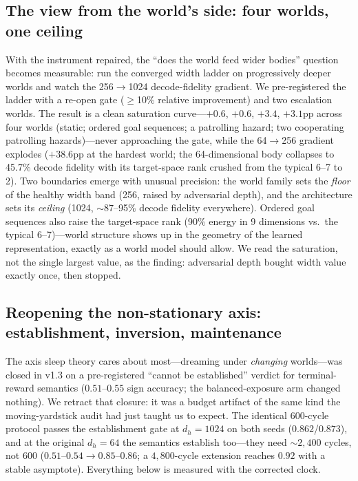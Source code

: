\documentclass[11pt,a4paper]{article}
\begin{document}
\subsection{The view from the world's side: four worlds, one ceiling}\label{sec:kfamily}

With the instrument repaired, the ``does the world feed wider bodies'' question becomes measurable: run the converged width ladder on progressively deeper worlds and watch the 256$\to$1024 decode-fidelity gradient. We pre-registered the ladder with a re-open gate ($\ge$10\% relative improvement) and two escalation worlds. The result is a clean saturation curve---$+0.6$, $+0.6$, $+3.4$, $+3.1$pp across four worlds (static; ordered goal sequences; a patrolling hazard; two cooperating patrolling hazards)---never approaching the gate, while the 64$\to$256 gradient explodes ($+38.6$pp at the hardest world; the 64-dimensional body collapses to 45.7\% decode fidelity with its target-space rank crushed from the typical 6--7 to 2). Two boundaries emerge with unusual precision: the world family sets the \emph{floor} of the healthy width band (256, raised by adversarial depth), and the architecture sets its \emph{ceiling} (1024, ${\sim}87$--95\% decode fidelity everywhere). Ordered goal sequences also raise the target-space rank (90\% energy in 9 dimensions vs.\ the typical 6--7)---world structure shows up in the geometry of the learned representation, exactly as a world model should allow. We read the saturation, not the single largest value, as the finding: adversarial depth bought width value exactly once, then stopped.

\subsection{Reopening the non-stationary axis: establishment, inversion, maintenance}\label{sec:nonstat}

The axis sleep theory cares about most---dreaming under \emph{changing} worlds---was closed in v1.3 on a pre-registered ``cannot be established'' verdict for terminal-reward semantics ($0.51$--$0.55$ sign accuracy; the balanced-exposure arm changed nothing). We retract that closure: it was a budget artifact of the same kind the moving-yardstick audit had just taught us to expect. The identical 600-cycle protocol passes the establishment gate at $d_h{=}1024$ on both seeds ($0.862$/$0.873$), and at the original $d_h{=}64$ the semantics establish too---they need ${\sim}2{,}400$ cycles, not 600 ($0.51$--$0.54 \rightarrow 0.85$--$0.86$; a $4{,}800$-cycle extension reaches $0.92$ with a stable asymptote). Everything below is measured with the corrected clock.
\end{document}
